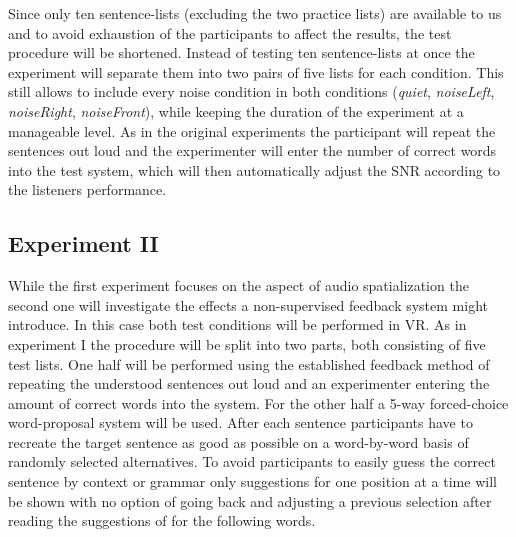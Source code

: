 \documentclass[a4paper,11pt]{article}%
\renewcommand{\\}{\vspace*{0.5\baselineskip} \newline}
\begin{document}
Since only ten sentence-lists (excluding the two practice lists) are available to us and to avoid exhaustion of the participants to affect the results, the test procedure will be shortened. Instead of testing ten sentence-lists at once the experiment will separate them into two pairs of five lists for each condition. This still allows to include every noise condition in both conditions (\textit{quiet}, \textit{noiseLeft}, \textit{noiseRight}, \textit{noiseFront}), while keeping the duration of the experiment at a manageable level. As in the original experiments the participant will repeat the sentences out loud and the experimenter will enter the number of correct words into the test system, which will then automatically adjust the \ac{SNR} according to the listeners performance.



\subsection{Experiment II}
While the first experiment focuses on the aspect of audio spatialization the second one will investigate the effects a non-supervised feedback system might introduce. In this case both test conditions will be performed in \ac{VR}. As in experiment I the procedure will be split into two parts, both consisting of five test lists. One half will be performed using the established feedback method of repeating the understood sentences out loud and an experimenter entering the amount of correct words into the system. For the other half a 5-way forced-choice word-proposal system will be used. After each sentence participants have to recreate the target sentence as good as possible on a word-by-word basis of randomly selected alternatives. To avoid participants to easily guess the correct sentence by context or grammar only suggestions for one position at a time will be shown with no option of going back and adjusting a previous selection after reading the suggestions of for the following words.
\end{document}
